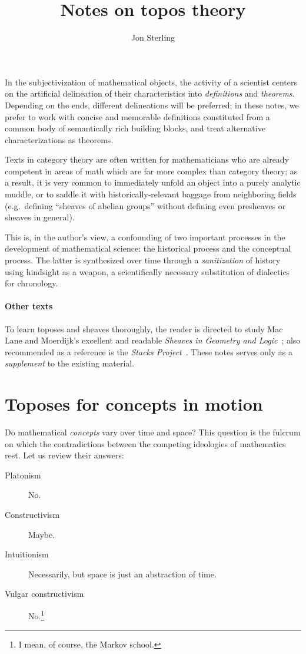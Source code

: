 \documentclass{article}
\title{Notes on topos theory}
\author{Jon Sterling}
\affil{Carnegie Mellon University}
\date{}
\begin{document}
\maketitle

In the subjectivization of mathematical objects, the activity of a
scientist centers on the artificial delineation of their
characteristics into \emph{definitions} and \emph{theorems}. Depending
on the ends, different delineations will be preferred; in these notes,
we prefer to work with concise and memorable definitions constituted
from a common body of semantically rich building blocks, and treat
alternative characterizations as theorems.

Texts in category theory are often written for mathematicians who
are already competent in areas of math which are far more complex than
category theory; as a result, it is very common to immediately unfold
an object into a purely analytic muddle, or to saddle it with
historically-relevant baggage from neighboring fields (e.g.\ defining
``sheaves of abelian groups'' without defining even presheaves or
sheaves in general).

This is, in the author's view, a confounding of two important
processes in the development of mathematical science: the historical
process and the conceptual process. The latter is synthesized over
time through a \emph{sanitization} of history using hindsight as a
weapon, a scientifically necessary substitution of dialectics for
chronology.

\paragraph{Other texts}
To learn toposes and sheaves thoroughly, the reader is directed to
study Mac Lane and Moerdijk's excellent and readable \emph{Sheaves in
  Geometry and Logic}~\cite{maclane-moerdijk:1992}; also recommended
as a reference is the \emph{Stacks
  Project}~\cite{stacks-project}. These notes serves only as a
\emph{supplement} to the existing material.


\section{Toposes for concepts in motion}

Do mathematical \emph{concepts} vary over time and space? This
question is the fulcrum on which the contradictions between the
competing ideologies of mathematics rest. Let us review their answers:
\begin{description}
\item[Platonism] No.
\item[Constructivism] Maybe.
\item[Intuitionism] Necessarily, but space is just an abstraction of
  time.
\item[Vulgar constructivism] No.\footnote{I mean, of course, the Markov school.}
\end{description}
\end{document}
